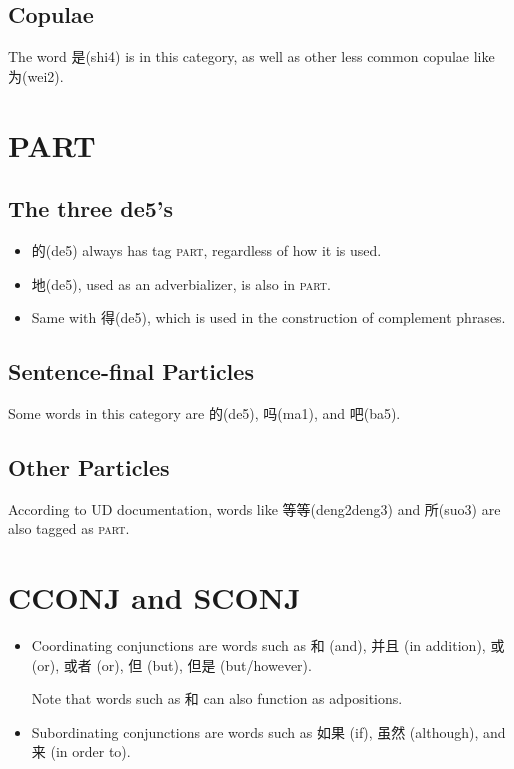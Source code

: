 \documentclass[UTF8,oneside]{book}
\def\particle{\textsc{part}}
\begin{document}
\subsection{Copulae}

The word 是(shi4) is in this category, as well as other less common copulae like 为(wei2). 

\section{PART}

\subsection{The three de5's}

\begin{itemize}
\item {}
的(de5) always has tag \particle, regardless of how it is used. 
\item 地(de5), used as an adverbializer, is also in \particle.
\item Same with 得(de5), which is used in the construction of complement phrases. 
\end{itemize}

\subsection{Sentence-final Particles}

Some words in this category are 的(de5), 吗(ma1), and 吧(ba5).

\subsection{Other Particles}

According to UD documentation, words like 等等(deng2deng3) and 所(suo3) are also tagged as \particle.

\section{CCONJ and SCONJ}

\begin{itemize}
\item Coordinating conjunctions are words such as 和 (and), 并且 (in addition), 或 (or), 或者 (or), 但 (but), 但是 (but/however). 

Note that words such as 和 can also function as adpositions.

\item Subordinating conjunctions are words such as 如果 (if), 虽然 (although), and 来 (in order to). 
\end{itemize}
\end{document}
